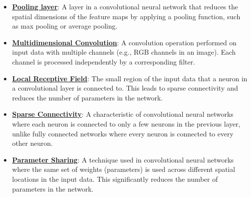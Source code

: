 \documentclass{article}%
\begin{document}
\begin{itemize}[leftmargin=*]
\item \href{https://purdue.brightspace.com/d2l/common/assets/pdfjs-d2l-dist/1.0.14-legacy/web/viewer.html?file=\%2Fcontent\%2Fenforced\%2F1095467-wl.202510.CS.24300.001\%2F09L1-cnn.pdf\%3Fou\%3D1095467\&lang=en-us\&container=d2l-fileviewer-rendered-pdf\&fullscreen=d2l-fileviewer-rendered-pdf-dialog\&height=667#page=6}{\textbf{Pooling layer}}: A layer in a convolutional neural network that reduces the spatial dimensions of the feature maps by applying a pooling function, such as max pooling or average pooling.%
\item \href{https://purdue.brightspace.com/d2l/common/assets/pdfjs-d2l-dist/1.0.14-legacy/web/viewer.html?file=\%2Fcontent\%2Fenforced\%2F1095467-wl.202510.CS.24300.001\%2F09L1-cnn.pdf\%3Fou\%3D1095467\&lang=en-us\&container=d2l-fileviewer-rendered-pdf\&fullscreen=d2l-fileviewer-rendered-pdf-dialog\&height=667#page=8}{\textbf{Multidimensional Convolution}}: A convolution operation performed on input data with multiple channels (e.g., RGB channels in an image). Each channel is processed independently by a corresponding filter.%
\item \href{https://purdue.brightspace.com/d2l/common/assets/pdfjs-d2l-dist/1.0.14-legacy/web/viewer.html?file=\%2Fcontent\%2Fenforced\%2F1095467-wl.202510.CS.24300.001\%2F09L1-cnn.pdf\%3Fou\%3D1095467\&lang=en-us\&container=d2l-fileviewer-rendered-pdf\&fullscreen=d2l-fileviewer-rendered-pdf-dialog\&height=667#page=10}{\textbf{Local Receptive Field}}: The small region of the input data that a neuron in a convolutional layer is connected to. This leads to sparse connectivity and reduces the number of parameters in the network.%
\item \href{https://purdue.brightspace.com/d2l/common/assets/pdfjs-d2l-dist/1.0.14-legacy/web/viewer.html?file=\%2Fcontent\%2Fenforced\%2F1095467-wl.202510.CS.24300.001\%2F09L1-cnn.pdf\%3Fou\%3D1095467\&lang=en-us\&container=d2l-fileviewer-rendered-pdf\&fullscreen=d2l-fileviewer-rendered-pdf-dialog\&height=667#page=10}{\textbf{Sparse Connectivity}}: A characteristic of convolutional neural networks where each neuron is connected to only a few neurons in the previous layer, unlike fully connected networks where every neuron is connected to every other neuron.%
\item \href{https://purdue.brightspace.com/d2l/common/assets/pdfjs-d2l-dist/1.0.14-legacy/web/viewer.html?file=\%2Fcontent\%2Fenforced\%2F1095467-wl.202510.CS.24300.001\%2F09L1-cnn.pdf\%3Fou\%3D1095467\&lang=en-us\&container=d2l-fileviewer-rendered-pdf\&fullscreen=d2l-fileviewer-rendered-pdf-dialog\&height=667#page=12}{\textbf{Parameter Sharing}}: A technique used in convolutional neural networks where the same set of weights (parameters) is used across different spatial locations in the input data. This significantly reduces the number of parameters in the network.%

\end{itemize}
\end{document}
